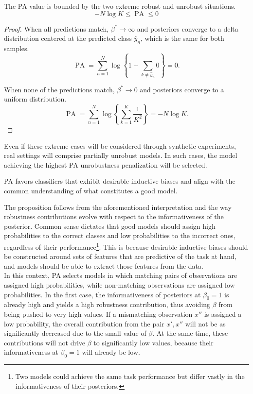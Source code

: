 \begin{theorem}
    The PA value is bounded by the two extreme robust and unrobust situations.
    $$
    -N \log K \leq \operatorname{PA} \leq 0
    $$
\end{theorem}
\begin{proof}
    When all predictions match, 
    $\beta^{*} \longrightarrow \infty$ and posteriors converge to a delta distribution centered at
    the predicted class $\hat{y}_n$, which is the same for both samples.
    $$
    \operatorname{PA} = \sum_{n=1}^N \log \left\{ 1 + \sum_{k \neq \hat{y}_n} 0 \right\} = 0.
    $$

    When none of the predictions match, $\beta^{*} \longrightarrow 0$ and posteriors converge to a uniform distribution.
    $$
    \operatorname{PA} = \sum_{n=1}^N \log \left\{ \sum_{k=1}^K \frac{1}{K^2} \right\} = -N \log K.
    $$
\end{proof}

Even if these extreme cases will be considered through synthetic experiments, real
settings will comprise partially unrobust models. In such cases, the model achieving the
highest PA unrobustness penalization will be selected.

\begin{proposition}\label{prop:pa_inductive_bias}
    PA favors classifiers that exhibit desirable inductive biases and 
    align with the common understanding of what constitutes a good model.
\end{proposition}

The proposition follows from the aforementioned interpretation and the way robustness contributions evolve 
with respect to the informativeness of the posterior. Common sense dictates that good models should assign 
high probabilities to the correct classes and low probabilities to the incorrect ones, regardless 
of their performance\footnote{Two models could achieve the same task performance but differ vastly in the informativeness
of their posteriors.}. This is because desirable inductive biases should be constructed around 
sets of features that are predictive of the task at hand, and models should be able to extract 
those features from the data. \\

In this context, PA selects models in which matching pairs of observations are assigned high probabilities,
while non-matching observations are assigned low probabilities. In the first case, the informativeness
of posteriors at $\beta_0=1$ is already high and yields a high robustness contribution, thus
avoiding $\beta$ from being pushed to very high values. If a mismatching observation $x''$ is assigned a
low probability, the overall contribution from the pair $x',x''$ will not be as significantly decreased due
to the small value of $\beta$. At the same time, these contributions will not drive $\beta$ to significantly 
low values, because their informativeness at $\beta_0=1$ will already be low.\\

